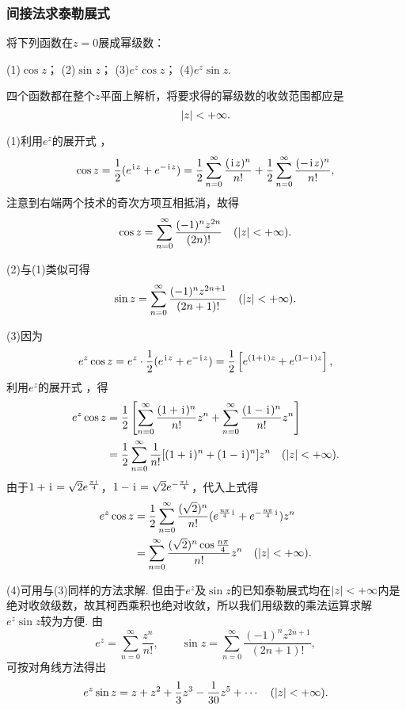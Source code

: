 \subsubsection{间接法求泰勒展式}
\begin{example}
将下列函数在\(z = 0\)展成幂级数：

(1)\(\cos z\)； \hfill (2)\(\sin z\)； \hfill (3)\(e^z \cos z\)； \hfill (4)\(e^z \sin z\).
\begin{solution}
四个函数都在整个\(z\)平面上解析，将要求得的幂级数的收敛范围都应是\[
\abs{z}<+\infty.
\]

(1)利用\(e^z\)的展开式 ，\[
\cos z = \frac{1}{2} (e^{\kern1pt\mathrm{i}\kern1pt z} + e^{-\kern1pt\mathrm{i}\kern1pt z})
= \frac{1}{2} \sum\limits_{n=0}^{\infty} \frac{(\kern1pt\mathrm{i}\kern1pt z)^n}{n!} + \frac{1}{2} \sum\limits_{n=0}^{\infty} \frac{(-\kern1pt\mathrm{i}\kern1pt z)^n}{n!},
\]注意到右端两个技术的奇次方项互相抵消，故得\begin{equation}\label{equation:解析函数的级数表示.余弦函数的泰勒展式}
\cos z = \sum\limits_{n=0}^{\infty} \frac{(-1)^n z^{2n}}{(2n)!} \quad(\abs{z}<+\infty).
\end{equation}

(2)与(1)类似可得\begin{equation}\label{equation:解析函数的级数表示.正弦函数的泰勒展式}
\sin z = \sum\limits_{n=0}^{\infty} \frac{(-1)^n z^{2n+1}}{(2n+1)!} \quad(\abs{z}<+\infty).
\end{equation}

(3)因为\[
e^z \cos z = e^z \cdot \frac{1}{2} (e^{\kern1pt\mathrm{i}\kern1pt z} + e^{-\kern1pt\mathrm{i}\kern1pt z})
= \frac{1}{2} \left[e^{(1+\kern1pt\mathrm{i}\kern1pt)z} + e^{(1-\kern1pt\mathrm{i}\kern1pt)z}\right],
\]利用\(e^z\)的展开式 ，得\begin{align*}
e^z \cos z
&= \frac{1}{2} \left[
\sum\limits_{n=0}^{\infty} \frac{(1+\kern1pt\mathrm{i}\kern1pt)^n}{n!} z^n
+ \sum\limits_{n=0}^{\infty} \frac{(1-\kern1pt\mathrm{i}\kern1pt)^n}{n!} z^n
\right] \\
&= \frac{1}{2} \sum\limits_{n=0}^{\infty} \frac{1}{n!} [(1+\kern1pt\mathrm{i}\kern1pt)^n+(1-\kern1pt\mathrm{i}\kern1pt)^n] z^n
\quad(\abs{z}<+\infty).
\end{align*}
由于\(1+\kern1pt\mathrm{i}\kern1pt=\sqrt{2} e^{\frac{\pi\kern1pt\mathrm{i}\kern1pt}{4}}\)，\(1-\kern1pt\mathrm{i}\kern1pt=\sqrt{2} e^{-\frac{\pi\kern1pt\mathrm{i}\kern1pt}{4}}\)，代入上式得\begin{equation}
\begin{split}
e^z \cos z
&= \frac{1}{2} \sum\limits_{n=0}^{\infty} \frac{(\sqrt{2})^n}{n!} (e^{\frac{n\pi}{4}\kern1pt\mathrm{i}\kern1pt}+e^{-\frac{n\pi}{4}\kern1pt\mathrm{i}\kern1pt}) z^n \\
&= \sum\limits_{n=0}^{\infty} \frac{(\sqrt{2})^n \cos\frac{n\pi}{4}}{n!} z^n
\quad(\abs{z}<+\infty).
\end{split}
\end{equation}

(4)可用与(3)同样的方法求解.
但由于\(e^z\)及\(\sin z\)的已知泰勒展式均在\(\abs{z}<+\infty\)内是绝对收敛级数，故其柯西乘积也绝对收敛，所以我们用级数的乘法运算求解\(e^z \sin z\)较为方便.
由\[
e^z = \sum\limits_{n=0}^{\infty} \frac{z^n}{n!},
\qquad
\sin z = \sum\limits_{n=0}^{\infty} \frac{(-1)^n z^{2n+1}}{(2n+1)!},
\]可按对角线方法得出\[
e^z \sin z
= z + z^2 + \frac{1}{3} z^3 - \frac{1}{30} z^5 + \dotsb
\quad(\abs{z}<+\infty).
\]
\end{solution}
\end{example}

